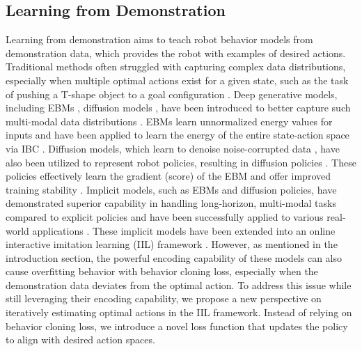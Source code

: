 \subsection{Learning from Demonstration}
Learning from demonstration aims to teach robot behavior models from demonstration data, which provides the robot with examples of desired actions. 
Traditional methods often struggled with capturing complex data distributions, especially when multiple optimal actions exist for a given state, such as the task of pushing a T-shape object to a goal configuration \cite{2023_diffusionpolicy, 2024_RSS_pushT_Traj_optimization}.
Deep generative models, including EBMs \cite{2019_EBM_Du_Yilun, 2021_how_to_train_EBM},  diffusion models \cite{2015_diffusion, 2020_diffusion}, have been introduced to better capture such multi-modal data distributions \cite{2024_survey_deep_generative_model_in_robotics}. EBMs learn unnormalized energy values for inputs and have been applied to learn the energy of the entire state-action space via IBC \cite{2022_implicit_BC}.  
Diffusion models, which learn to denoise noise-corrupted data \cite{2015_diffusion, 2020_diffusion}, have also been utilized to represent robot policies, resulting in diffusion policies \cite{2023_diffusionpolicy, 2023_score_diffusion_policy}. These policies effectively learn the gradient (score) of the EBM \cite{2020_Score_based_diffusion} and offer improved training stability \cite{2023_diffusionpolicy}. Implicit models, such as EBMs and diffusion policies, have demonstrated superior capability in handling long-horizon, multi-modal tasks compared to explicit policies and have been successfully applied to various real-world applications \cite{2024_EBM_planning_air_hockey_application, 2024_IBC_RL_planning, 2024_survey_deep_generative_model_in_robotics}.
These implicit models have been extended into an online interactive imitation learning (IIL) framework 
\cite{2023_IIFL_implicit_interactive_BC, 2024_Diffusion_dagger}.  
However, as mentioned in the introduction section, the powerful encoding capability of these models can also cause overfitting behavior with behavior cloning loss, especially when the demonstration data deviates from the optimal action. 
To address this issue while still leveraging their encoding capability, 
we propose a new perspective on iteratively estimating optimal actions in the IIL framework. 
Instead of relying on behavior cloning loss, we introduce a novel loss function that updates the policy to align with desired action spaces. 


